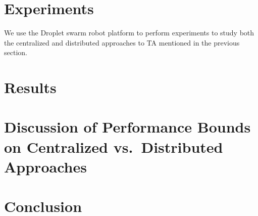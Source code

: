 \documentclass[11pt, onecolumn, compsoc, letterpaper]{article}
\begin{document}
\section{Experiments}
We use the Droplet swarm robot platform to perform experiments to study both the centralized and distributed approaches to TA mentioned in the previous section. 



\section{Results}




\section{Discussion of Performance Bounds on Centralized vs.~Distributed Approaches}\label{ref:disc}


\section{Conclusion}




\end{document}
